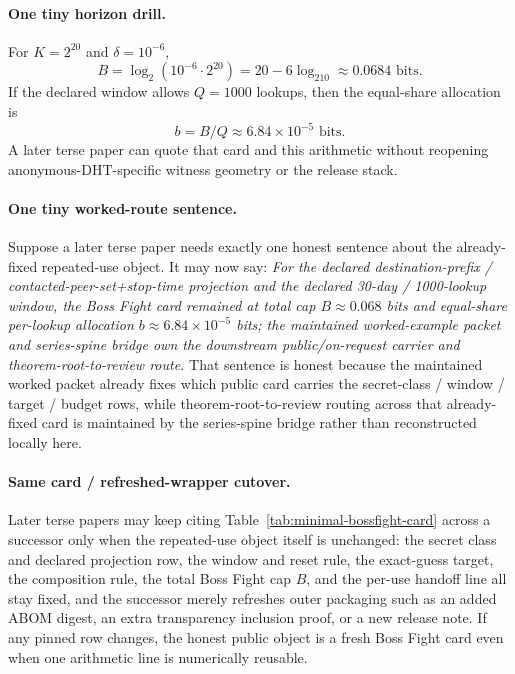 \documentclass[11pt]{article}
\newcommand{\logtwo}{\log_2}
\begin{document}
\paragraph{One tiny horizon drill.} For $K=2^{20}$ and $\delta=10^{-6}$,
\[
B=\logtwo(10^{-6}\cdot 2^{20}) = 20 - 6\logtwo 10 \approx 0.0684 \text{ bits}.
\]
If the declared window allows $Q=1000$ lookups, then the equal-share allocation is
\[
b = B/Q \approx 6.84\times 10^{-5} \text{ bits}.
\]
A later terse paper can quote that card and this arithmetic without reopening anonymous-DHT-specific witness geometry or the release stack.

\paragraph{One tiny worked-route sentence.}
Suppose a later terse paper needs exactly one honest sentence about the already-fixed repeated-use object. It may now say: \emph{For the declared destination-prefix / contacted-peer-set+stop-time projection and the declared 30-day / 1000-lookup window, the Boss Fight card remained at total cap $B\approx 0.068$ bits and equal-share per-lookup allocation $b\approx 6.84\times 10^{-5}$ bits; the maintained worked-example packet and series-spine bridge own the downstream public/on-request carrier and theorem-root-to-review route.} That sentence is honest because the maintained worked packet already fixes which public card carries the secret-class / window / target / budget rows, while theorem-root-to-review routing across that already-fixed card is maintained by the series-spine bridge rather than reconstructed locally here.\cite{series:workedexample,series:seriesspines}

\paragraph{Same card / refreshed-wrapper cutover.}
Later terse papers may keep citing Table~\ref{tab:minimal-bossfight-card} across a successor only when the repeated-use object itself is unchanged: the secret class and declared projection row, the window and reset rule, the exact-guess target, the composition rule, the total Boss Fight cap $B$, and the per-use handoff line all stay fixed, and the successor merely refreshes outer packaging such as an added ABOM digest, an extra transparency inclusion proof, or a new release note. If any pinned row changes, the honest public object is a fresh Boss Fight card even when one arithmetic line is numerically reusable.
\end{document}
